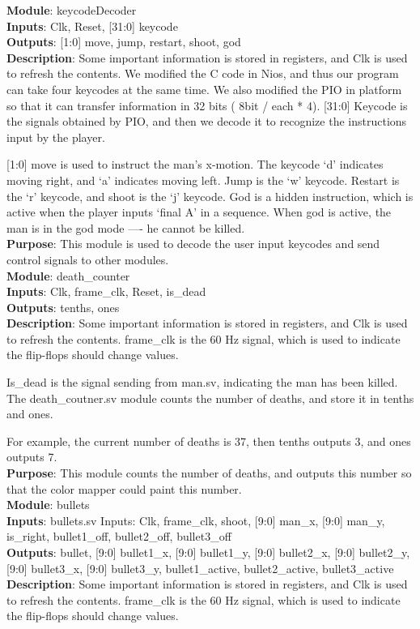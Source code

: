 \documentclass[12pt]{article}
\begin{document}
\textbf{Module}: keycodeDecoder \\ 
\textbf{Inputs}: Clk, Reset, [31:0] keycode \\ 
\textbf{Outputs}: [1:0] move, jump, restart, shoot, god \\
\textbf{Description}: Some important information is stored in registers, and Clk is used to refresh the contents. We modified the C code in Nios, and thus our program can take four keycodes at the same time. We also modified the PIO in platform so that it can transfer information in 32 bits ( 8bit / each *  4). [31:0] Keycode is the signals obtained by PIO, and then we decode it to recognize the instructions input by the player. 

[1:0] move is used to instruct the man’s x-motion. The keycode ‘d’ indicates moving right, and ‘a’ indicates moving left. Jump is the ‘w’ keycode. Restart is the ‘r’ keycode, and shoot is the ‘j’ keycode. God is a hidden instruction, which is active when the player inputs ‘final A’ in a sequence. When god is active, the man is in the god mode ---- he cannot be killed. \\ 
\textbf{Purpose}: This module is used to decode the user input keycodes and send control signals to other modules. \\

\textbf{Module}: death\_counter \\ 
\textbf{Inputs}: Clk, frame\_clk, Reset, is\_dead \\ 
\textbf{Outputs}: tenths, ones \\
\textbf{Description}: Some important information is stored in registers, and Clk is used to refresh the contents. frame\_clk is the 60 Hz signal, which is used to indicate the flip-flops should change values.

Is\_dead is the signal sending from man.sv, indicating the man has been killed. The death\_coutner.sv module counts the number of deaths, and store it in tenths and ones.

For example, the current number of deaths is 37, then tenths outputs 3, and ones outputs 7. \\ 
\textbf{Purpose}: This module counts the number of deaths, and outputs this number so that the color mapper could paint this number. \\

\textbf{Module}: bullets \\ 
\textbf{Inputs}: bullets.sv
Inputs: Clk, frame\_clk, shoot, [9:0] man\_x, [9:0] man\_y, is\_right, bullet1\_off, bullet2\_off, bullet3\_off \\ 
\textbf{Outputs}: bullet, [9:0] bullet1\_x, [9:0] bullet1\_y, [9:0] bullet2\_x, [9:0] bullet2\_y, [9:0] bullet3\_x, [9:0] bullet3\_y, bullet1\_active, bullet2\_active, bullet3\_active \\
\textbf{Description}: Some important information is stored in registers, and Clk is used to refresh the contents. frame\_clk is the 60 Hz signal, which is used to indicate the flip-flops should change values.
\end{document}
